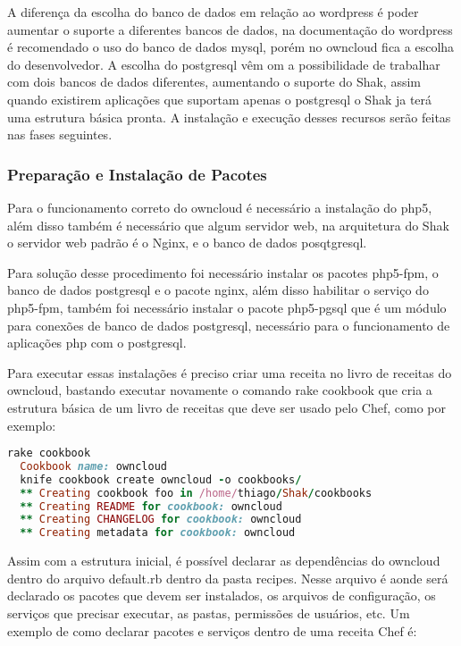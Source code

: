 A diferença da escolha do banco de dados em relação ao wordpress é poder aumentar
o suporte a diferentes bancos de dados, na documentação do wordpress é recomendado
o uso do banco de dados mysql, porém no owncloud fica a escolha do desenvolvedor.
A escolha do postgresql vêm om a possibilidade de trabalhar com dois bancos de
dados diferentes, aumentando o suporte do Shak, assim quando existirem aplicações
que suportam apenas o postgresql o Shak ja terá uma estrutura básica pronta.
A instalação e execução desses recursos serão feitas nas fases seguintes.

\subsubsection{Preparação e Instalação de Pacotes}

Para o funcionamento correto do owncloud é necessário a instalação do php5, além
disso também é necessário que algum servidor web, na arquitetura do Shak o servidor
web padrão é o Nginx, e o banco de dados posqtgresql.

Para solução desse procedimento foi necessário instalar os pacotes php5-fpm, o banco
de dados postgresql e o pacote nginx, além disso habilitar o serviço do php5-fpm,
também foi necessário instalar o pacote php5-pgsql que é um módulo para
conexões de banco de dados postgresql, necessário para o funcionamento de
aplicações php com o postgresql.

Para executar essas instalações é preciso criar uma receita no livro de receitas
do owncloud, bastando executar novamente o comando rake cookbook que cria a estrutura básica
de um livro de receitas que deve ser usado pelo Chef, como por exemplo:

\begin{lstlisting}[language=Ruby,label=dice_index,caption={Exemplo de criação de estrutura básica de livro de receitas do owncloud com shak}]
  rake cookbook
  Cookbook name: owncloud
  knife cookbook create owncloud -o cookbooks/
  ** Creating cookbook foo in /home/thiago/Shak/cookbooks
  ** Creating README for cookbook: owncloud
  ** Creating CHANGELOG for cookbook: owncloud
  ** Creating metadata for cookbook: owncloud
\end{lstlisting}

Assim com a estrutura inicial, é possível declarar as dependências do owncloud
dentro do arquivo default.rb dentro da pasta recipes. Nesse arquivo é aonde
será declarado os pacotes que devem ser instalados, os arquivos de configuração,
os serviços que precisar executar, as pastas, permissões de usuários, etc. Um exemplo
de como declarar pacotes e serviços dentro de uma receita Chef é:

